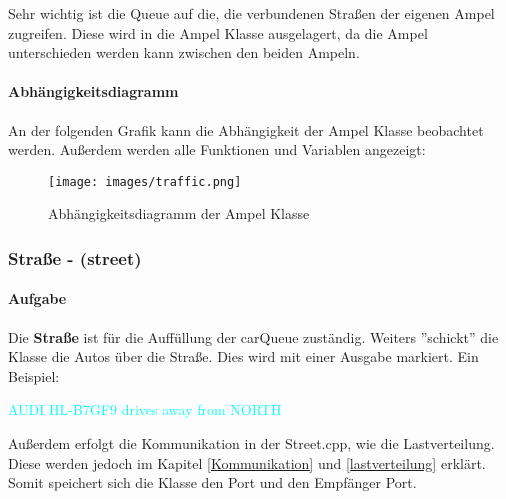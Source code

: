 \documentclass[12pt, oneside]{article}
\begin{document}
\noindent Sehr wichtig ist die Queue auf die, die verbundenen Straßen der eigenen Ampel zugreifen. Diese wird in die Ampel Klasse ausgelagert, da die Ampel unterschieden werden kann zwischen den beiden Ampeln.

\paragraph{Abhängigkeitsdiagramm} 
An der folgenden Grafik kann die Abhängigkeit der Ampel Klasse beobachtet werden. Außerdem werden alle Funktionen und Variablen angezeigt:

\begin{figure}[H]
    \texttt{[image: images/traffic.png]} 
    \caption{Abhängigkeitsdiagramm der Ampel Klasse}
    \label{fig:traffic}
\end{figure}


\subsubsection{Straße - (street)}
\paragraph{Aufgabe}
Die \textbf{Straße} ist für die Auffüllung der carQueue zuständig. Weiters ''schickt'' die Klasse die Autos über die Straße. Dies wird mit einer Ausgabe markiert. Ein Beispiel: \vspace{1em}

\noindent [CAR] \textcolor{cyan}{AUDI HL-B7GF9 drives away from NORTH} \vspace{1em}

\noindent Außerdem erfolgt die Kommunikation in der Street.cpp, wie die Lastverteilung. Diese werden jedoch im Kapitel \ref{Kommunikation} und \ref{lastverteilung} erklärt. Somit speichert sich die Klasse den Port und den Empfänger Port.
\end{document}
